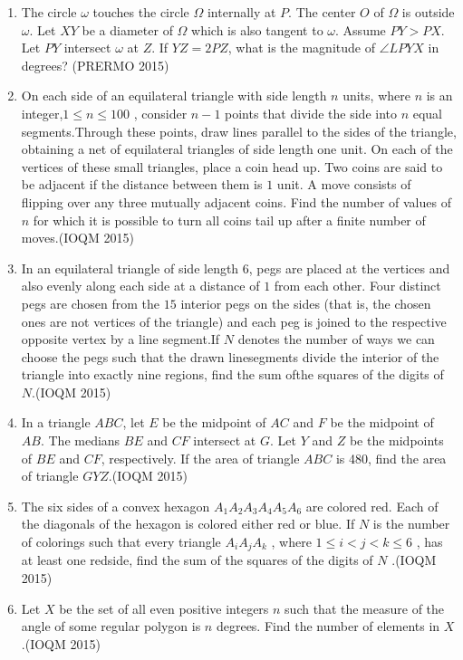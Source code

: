 \begin{enumerate}
\item The circle $ \omega $ touches the circle $ \Omega $ internally at $ P $. The center $ O $ of $ \Omega $ is outside $ \omega $. Let $XY$ be a diameter of $ \Omega $ which is also tangent to $ \omega $. Assume $ PY > PX $. Let $ PY $ intersect $ \omega $ at $ Z $. If $ YZ = 2PZ $, what is the magnitude of $ \angle LPYX $ in degrees? \hfill(PRERMO 2015)
	\item On each side of an equilateral triangle with side length $n$ units, where $n$ is an integer,$1 \leq n \leq 100$ , consider $n - 1$ points that divide the side into $n$ equal segments.Through these points, draw lines parallel to the sides of the triangle, obtaining a net of equilateral triangles of side length one unit. On each of the vertices of these small triangles, place a coin head up. Two coins are said to be adjacent if the distance between them is $1$ unit. A move consists of flipping over any three mutually adjacent coins. Find the number of values of $n$ for which it is possible to turn all coins tail up after a finite number of moves.\hfill(IOQM 2015)


	\item In an equilateral triangle of side length $6$, pegs are placed at the vertices and also evenly along each side at a distance of $1$ from each other. Four distinct pegs are chosen from the $15$ interior pegs on the sides (that is, the chosen ones are not vertices of the triangle) and each peg is joined to the respective opposite vertex by a line segment.If $N$ denotes the number of ways we can choose the pegs such that the drawn linesegments divide the interior of the triangle into exactly nine regions, find the sum ofthe squares of the digits of $N$.\hfill(IOQM 2015)		
	\item In a triangle $ABC$, let $E$ be the midpoint of $AC$ and $F$ be the midpoint of $AB$. The medians $BE$ and $CF$ intersect at $G$. Let $Y$ and $Z$ be the midpoints of $BE$ and $CF$, respectively. If the area of triangle $ABC$ is 480, find the area of triangle $GYZ$.\hfill(IOQM 2015)
	    \item The six sides of a convex hexagon $A_{1}A_{2}A_{3}A_{4}A_{5}A_{6}$ are colored red. Each of the diagonals of the hexagon is colored either red or blue. If $N$ is the number of colorings such that every triangle $A_{i}A_{j}A_{k}$ , where $1 \leq i < j < k \leq 6$ , has at least one redside, find the sum of the squares of the digits of $N$ .\hfill(IOQM 2015)
    \item Let $X$ be the set of all even positive integers $n$ such that the measure of the angle of some regular polygon is $n$ degrees. Find the number of elements in $X$ .\hfill(IOQM 2015)
    

\end{enumerate}
